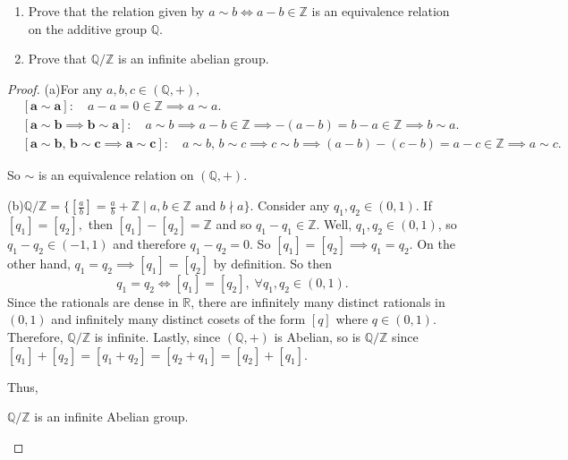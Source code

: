 \documentclass[addpoints,10pt]{exam}
\theoremstyle{plain}
\theoremstyle{definition}
\newtheorem{prob}[thm]{Problem}
\theoremstyle{plain}
\theoremstyle{plain}
\theoremstyle{definition}
\let\oldprob\prob
\let\endoldprob\endprob
\renewenvironment{prob}
  {\begin{singlespace}\oldprob}
  {\endoldprob\end{singlespace}}
\newcommand{\belowtitle}{\leavevmode\newline}
\newcommand{\QQ}{\ensuremath{\mathbb{Q}}}
\newcommand{\RR}{\ensuremath{\mathbb{R}}}
\newcommand{\ZZ}{\ensuremath{\mathbb{Z}}}
\begin{document}
\setcounter{thm}{1}   %

\begin{prob}\belowtitle
  \begin{enumerate}[label=(\alph*)]
    \item Prove that the relation given by $a \sim b \iff a - b \in \mathbb{Z}$ is an equivalence relation on the additive group $\mathbb{Q}$.
    \item Prove that $\mathbb{Q}/\mathbb{Z}$ is an infinite abelian group.
  \end{enumerate}
\end{prob}

\begin{proof}\belowtitle
    (a)\quad For any $a,b,c\in (\QQ,+),$
    \begin{align*}
        &\mathbf{[a\sim a]:}\quad a-a=0\in \ZZ \implies a\sim a.\\
        &\mathbf{[a\sim b\implies b\sim a]:}\quad a\sim b\implies a-b\in \ZZ \implies -(a-b)=b-a\in \ZZ\implies  b\sim a.\\
        &\mathbf{[a\sim b,\,b\sim c\implies a\sim c]:}\quad a\sim b,\,b\sim c\implies c\sim b\implies (a-b)-(c-b)=a-c\in \ZZ\implies a\sim c.
    \end{align*}

    So $\sim$ is an equivalence relation on $(\QQ,+)$.

    (b)\quad $\QQ/\ZZ=\{[\frac{a}{b}]=\frac{a}{b}+\ZZ \mid a,b\in \ZZ\text{ and }b\nmid a\}$. Consider any $q_{1},q_{2}\in (0,1)$. If $[q_{1}]=[q_{2}],$ then $[q_{1}]-[q_{2}]=\ZZ$ and so $q_{1}-q_{1}\in \ZZ$. Well, $q_{1},q_{2}\in (0,1)$, so $q_{1}-q_{2}\in (-1,1)$ and therefore $q_{1}-q_{2}=0$. So $[q_{1}]=[q_{2}]\implies q_{1}=q_{2}$. On the other hand, $q_{1}=q_{2}\implies [q_{1}]=[q_{2}]$ by definition. So then
    $$q_{1}=q_{2}\iff [q_{1}]=[q_{2}],\;\forall q_{1},q_{2}\in (0,1).$$
    Since the rationals are dense in $\RR$, there are infinitely many distinct rationals in $(0,1)$ and infinitely many distinct cosets of the form $[q]$ where $q\in (0,1)$. Therefore, $\QQ/\ZZ$ is infinite. Lastly, since $(\QQ,+)$ is Abelian, so is $\QQ/\ZZ$ since $[q_{1}]+[q_{2}]=[q_{1}+q_{2}]=[q_{2}+q_{1}]=[q_{2}]+[q_{1}]$.

    Thus,
    \begin{center}
    $\QQ/\ZZ$ is an infinite Abelian group.
    \end{center}
\end{proof}
\newpage
\end{document}

